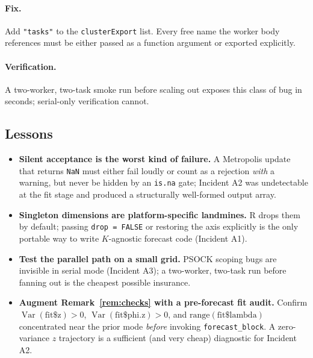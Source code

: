 \documentclass[11pt]{article}
\theoremstyle{definition}
\theoremstyle{remark}
\newcommand{\Var}{\operatorname{Var}}
\begin{document}
\paragraph{Fix.}
Add \texttt{"tasks"} to the \texttt{clusterExport} list. Every free
name the worker body references must be either passed as a
function argument or exported explicitly.

\paragraph{Verification.}
A two-worker, two-task smoke run before scaling out exposes this
class of bug in seconds; serial-only verification cannot.

\subsection{Lessons}

\begin{itemize}[leftmargin=1.4em]
  \item \textbf{Silent acceptance is the worst kind of failure.} A
        Metropolis update that returns \texttt{NaN} must either fail
        loudly or count as a rejection \emph{with} a warning, but
        never be hidden by an \texttt{is.na} gate; Incident A2 was
        undetectable at the fit stage and produced a structurally
        well-formed output array.
  \item \textbf{Singleton dimensions are platform-specific landmines.}
        R drops them by default; passing \texttt{drop = FALSE} or
        restoring the axis explicitly is the only portable way to
        write $K$-agnostic forecast code (Incident A1).
  \item \textbf{Test the parallel path on a small grid.} PSOCK
        scoping bugs are invisible in serial mode (Incident A3); a
        two-worker, two-task run before fanning out is the cheapest
        possible insurance.
  \item \textbf{Augment Remark~\ref{rem:checks} with a pre-forecast
        fit audit.} Confirm
        $\Var(\mathrm{fit\$z}) > 0$,
        $\Var(\mathrm{fit\$phi.z}) > 0$, and
        $\mathrm{range}(\mathrm{fit\$lambda})$ concentrated near the
        prior mode \emph{before} invoking \texttt{forecast\_block}.
        A zero-variance $z$ trajectory is a sufficient (and very
        cheap) diagnostic for Incident A2.
\end{itemize}
\end{document}
